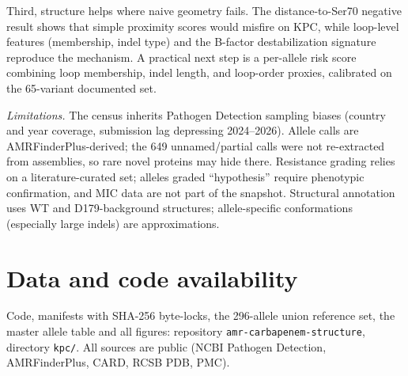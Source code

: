 \documentclass[11pt]{article}
\begin{document}
Third, structure helps where naive geometry fails. The distance-to-Ser70 negative result shows that simple proximity scores would misfire on KPC, while loop-level features (membership, indel type) and the B-factor destabilization signature reproduce the mechanism. A practical next step is a per-allele risk score combining loop membership, indel length, and loop-order proxies, calibrated on the 65-variant documented set.

\textit{Limitations.} The census inherits Pathogen Detection sampling biases (country and year coverage, submission lag depressing 2024--2026). Allele calls are AMRFinderPlus-derived; the 649 unnamed/partial calls were not re-extracted from assemblies, so rare novel proteins may hide there. Resistance grading relies on a literature-curated set; alleles graded ``hypothesis'' require phenotypic confirmation, and MIC data are not part of the snapshot. Structural annotation uses WT and D179-background structures; allele-specific conformations (especially large indels) are approximations.

\section{Data and code availability}
Code, manifests with SHA-256 byte-locks, the 296-allele union reference set, the master allele table and all figures: repository \texttt{amr-carbapenem-structure}, directory \texttt{kpc/}. All sources are public (NCBI Pathogen Detection, AMRFinderPlus, CARD, RCSB PDB, PMC).
\end{document}
